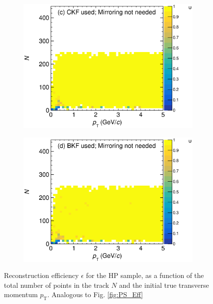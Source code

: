 \begin{figure}[ht!]
\begin{subfigure}[b]{0.48\textwidth}
         \centering
         \includegraphics[width=\textwidth]{figures/Appendix/testNDGArMirrorEfficiencyVSNPointsVSpT_NoMirror.eps}
         \caption{}
         \label{fig:HP_Eff_CKF_NoMirror}
     \end{subfigure}
     \begin{subfigure}[b]{0.48\textwidth}
         \centering
         \includegraphics[width=\textwidth]{figures/Appendix/testNDGArMirrorEfficiencyVSNPointsVSpT_BKF_NoMirror.eps}
         \caption{}
         \label{fig:HP_Eff_BKF_NoMirror}
     \end{subfigure}
        \caption{Reconstruction efficiency $\epsilon$ for the HP sample, as a function of the total number of points in the track $N$ and the initial true transverse momentum $p_\textrm{T}$. Analogous to Fig. \ref{fig:PS_Eff}} \label{fig:HP_Eff}
\end{figure}

